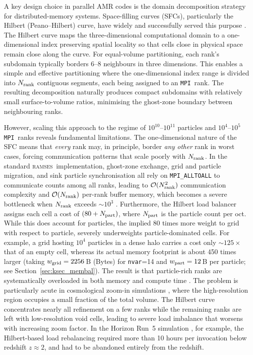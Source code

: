 \documentclass[fleqn,usenatbib]{mnras}
\newcommand{\ramses}{\textsc{ramses}}
\newcommand{\nrank}{N_{\rm rank}}
\newcommand{\Olog}[1]{\mathcal{O}(#1)}
\newcommand{\code}[1]{\texttt{#1}}
\newcommand{\mpi}[0]{\texttt{MPI}}
\begin{document}
A key design choice in parallel AMR codes is the domain decomposition
strategy for distributed-memory systems. Space-filling curves (SFCs), particularly the Hilbert
(Peano--Hilbert) curve, have widely and successfully served this purpose
\citep{Warren1993,Springel2005}. The Hilbert curve maps the
three-dimensional computational domain to a one-dimensional index
preserving spatial locality so that cells close in physical space
remain close along the curve.  For equal-volume partitioning, each
rank's subdomain typically borders 6--8 neighbours in three dimensions.
This enables a simple and effective
partitioning where the one-dimensional index range is divided into
$\nrank$ contiguous segments, each being assigned to an \mpi\ rank. The resulting
decomposition naturally produces compact subdomains with relatively
small surface-to-volume ratios, minimising the ghost-zone boundary
between neighbouring ranks.

However, scaling this approach to the regime of $10^{10}$--$10^{11}$
particles and $10^4$--$10^5$ \mpi\ ranks reveals fundamental
limitations. The one-dimensional nature of the SFC means that
\emph{every} rank may, in principle, border \emph{any other} rank in worst cases,
forcing communication patterns that scale poorly with $\nrank$. In the
standard \ramses\ implementation, ghost-zone exchange, grid and particle migration, and sink particle
synchronisation all rely on \code{MPI\_ALLTOALL} to communicate
counts among all ranks, leading to $\Olog{\nrank^2}$ communication
complexity and $\Olog{\nrank}$ per-rank buffer memory, which becomes a severe
bottleneck when $\nrank$ exceeds ${\sim}10^3$
\citep{Teyssier2002}. Furthermore, the Hilbert load balancer assigns each
cell a cost of $(80 + N_{\rm part})$, where $N_{\rm part}$ is the
particle count per oct.  While this does account for particles, the
implied 80 times more weight to grid with respect to particle, severely underweights
particle-dominated cells. For example, a grid hosting $10^4$ particles in a dense
halo carries a cost only ${\sim}125\times$ that of an empty cell,
whereas its actual memory footprint is about 450 times larger
(taking $w_{\rm grid}=2256$\,B (Bytes) for \code{nvar}=14 and $w_{\rm part}=12$\,B per particle; see
Section~\ref{sec:ksec_membal}).  The result is that particle-rich
ranks are systematically overloaded in both memory and compute time
\citep{Springel2005}. The problem is particularly acute in
cosmological zoom-in simulations \citep{Lee2021,Dubois2021}, where the
high-resolution region occupies a small fraction of the total volume.
The Hilbert curve concentrates nearly all refinement on a few ranks
while the remaining ranks are left with low-resolution void cells,
leading to severe load imbalance that worsens with increasing zoom
factor.  In the Horizon Run~5 simulation \citep{Lee2021}, for example,
the Hilbert-based load rebalancing required more than 10 hours per
invocation below redshift $z \approx 2$, and had to be abandoned entirely from the redshift.
\end{document}
